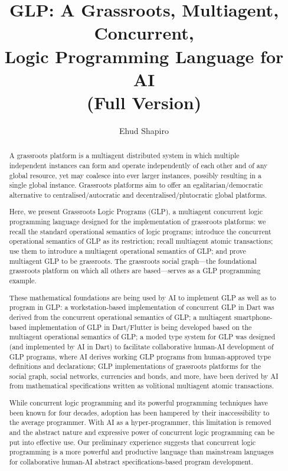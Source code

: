 \documentclass[copyright,creativecommons]{eptcs}
\title{GLP: A Grassroots, Multiagent, Concurrent,\\ Logic Programming Language for AI
\ifappendix\texorpdfstring{\\}{ }(Full Version)\fi}
\author{Ehud Shapiro
\institute{London School of Economics and Weizmann Institute of Science}
}
\theoremstyle{definition}
\theoremstyle{plain}
\theoremstyle{remark}
\begin{document}
\maketitle

\begin{abstract}
A grassroots platform is a multiagent distributed system in which multiple independent instances can form and operate independently of each other and of any global resource, yet may coalesce into ever larger instances, possibly resulting in a single global instance.  Grassroots platforms aim to offer an egalitarian/democratic alternative to  centralised/autocratic and decentralised/plutocratic global platforms.

Here, we present Grassroots Logic Programs (GLP), a multiagent concurrent logic programming language designed for the implementation of grassroots platforms:  we recall the standard operational semantics of logic programs; introduce the concurrent operational semantics of   GLP as its restriction; recall multiagent atomic transactions; use them to introduce a multiagent operational semantics of GLP; and prove multiagent GLP to be grassroots. The grassroots social graph---the foundational grassroots platform on which all others are based---serves as a GLP programming example.

These mathematical foundations are being used by AI to implement GLP as well as to program in GLP: a workstation-based implementation of concurrent GLP in Dart was derived from the concurrent operational semantics of GLP; a multiagent smartphone-based implementation of GLP in Dart/Flutter is being developed based on the multiagent operational semantics of GLP; a moded type system for GLP was designed (and implemented by AI in Dart) to facilitate collaborative human-AI development of GLP programs, where AI derives working GLP programs from human-approved type definitions and declarations; GLP implementations of grassroots platforms for the social graph, social networks, currencies and bonds, and more, have been derived by AI from mathematical specifications written as volitional multiagent atomic transactions.

While concurrent logic programming and its powerful programming techniques have been known for four decades, adoption has been hampered by their inaccessibility to the average programmer. With AI as a hyper-programmer, this limitation is removed and the abstract nature and expressive power of concurrent logic programming can be put into effective use.  Our preliminary experience suggests that concurrent logic programming is a more powerful and productive language than mainstream languages for collaborative human-AI abstract specifications-based program development.
\end{abstract}
\end{document}
